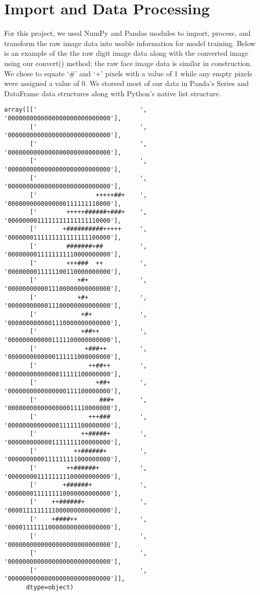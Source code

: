 \documentclass[10pt,parskip=half,
toc=sectionentrywithdots,
bibliography=totocnumbered,
captions=tableheading,numbers=noendperiod]{scrartcl}
\begin{document}
    \begingroup
    \let\cleardoublepage\relax
    \let\clearpage\relax
    \endgroup

\hypertarget{import-and-data-processing}{%
\section{Import and Data Processing}\label{import-and-data-processing}}

For this project, we used NumPy and Pandas modules to import, process,
and transform the raw image data into usable information for model
training. Below is an example of the the raw digit image data along with
the converted image using our convert() method; the raw face image data
is similar in construction. We chose to equate `\#' and `+' pixels with
a value of 1 while any empty pixels were assigned a value of 0. We
storeed most of our data in Panda's Series and DataFrame data structures
along with Python's native list structure.

\label{code:example_sym}
\begin{lstlisting}[aboveskip=5pt,basicstyle=\small,belowskip=5pt,breakindent=0pt,language={},numbers=none,postbreak={},xrightmargin=7pt]
array([['                            ', '0000000000000000000000000000'],
       ['                            ', '0000000000000000000000000000'],
       ['                            ', '0000000000000000000000000000'],
       ['                            ', '0000000000000000000000000000'],
       ['                            ', '0000000000000000000000000000'],
       ['                +++++##+    ', '0000000000000000111111110000'],
       ['        +++++######+###+    ', '0000000011111111111111110000'],
       ['       +##########+++++     ', '0000000111111111111111100000'],
       ['        #######+##          ', '0000000011111111110000000000'],
       ['        +++###  ++          ', '0000000011111100110000000000'],
       ['           +#+              ', '0000000000011100000000000000'],
       ['           +#+              ', '0000000000011100000000000000'],
       ['            +#+             ', '0000000000001110000000000000'],
       ['            +##++           ', '0000000000001111100000000000'],
       ['             +###++         ', '0000000000000111111000000000'],
       ['              ++##++        ', '0000000000000011111100000000'],
       ['                +##+        ', '0000000000000000111100000000'],
       ['                 ###+       ', '0000000000000000011110000000'],
       ['              +++###        ', '0000000000000011111100000000'],
       ['            ++#####+        ', '0000000000001111111100000000'],
       ['          ++######+         ', '0000000000111111111000000000'],
       ['        ++######+           ', '0000000011111111100000000000'],
       ['       +######+             ', '0000000111111110000000000000'],
       ['    ++######+               ', '0000111111111000000000000000'],
       ['    +####++                 ', '0000111111100000000000000000'],
       ['                            ', '0000000000000000000000000000'],
       ['                            ', '0000000000000000000000000000'],
       ['                            ', '0000000000000000000000000000']],
      dtype=object)
\end{lstlisting}
\end{document}

